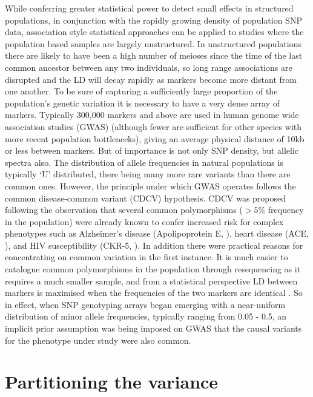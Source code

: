 While conferring greater statistical power to detect small effects in structured populations, in conjunction with the rapidly growing density of population SNP data, association style statistical approaches can be applied to studies where the population based samples are largely unstructured. In unstructured populations there are likely to have been a high number of meioses since the time of the last common ancestor between any two individuals, so long range associations are disrupted and the LD will decay rapidly as markers become more distant from one another. To be sure of capturing a sufficiently large proportion of the population's genetic variation it is necessary to have a very dense array of markers. Typically 300,000 markers and above are used in human genome wide association studies (GWAS) (although fewer are sufficient for other species with more recent population bottlenecks), giving an average physical distance of 10kb or less between markers. But of importance is not only SNP density, but allelic spectra also. The distribution of allele frequencies in natural populations is typically `U' distributed, there being many more rare variants than there are common ones. However, the principle under which GWAS operates follows the common disease-common variant (CDCV) hypothesis. CDCV was proposed \citep{Lander1996} following the observation that several common polymorphisms ($> 5\%$ frequency in the population) were already known to confer increased risk for complex phenotypes such as Alzheimer's disease (Apolipoprotein E, \citet{Strittmatter1993}), heart disease (ACE, \citet{Kreutz1995}), and HIV susceptibility (CKR-5, \citet{Liu1996}). In addition there were practical reasons for concentrating on common variation in the first instance. It is much easier to catalogue common polymorphisms in the population through resequencing as it requires a much smaller sample, and from a statistical perspective LD between markers is maximised when the frequencies of the two markers are identical \citep{Schork2000}. So in effect, when SNP genotyping arrays began emerging with a near-uniform distribution of minor allele frequencies, typically ranging from 0.05 - 0.5, an implicit prior assumption was being imposed on GWAS that the causal variants for the phenotype under study were also common.


\section{Partitioning the variance}

